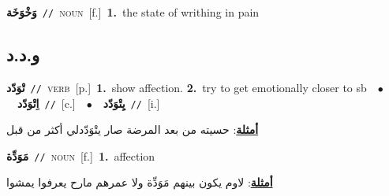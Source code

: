 \documentclass[10pt,a4paper,twoside]{article} %
\begin{document}
\begin{multicols}{2}
{\setlength\topsep{0pt}\textbf{\foreignlanguage{arabic}{وَخْوَخَة}}\ {\color{gray}\texttt{//}\color{black}}\ \textsc{noun}\ [f.]\ \textbf{1.}~the state of writhing in pain\ } \vspace{2mm}

\vspace{-3mm}
\subsection*{\color{blue}\foreignlanguage{arabic}{و.د.د}\color{blue}{}} 

{\setlength\topsep{0pt}\textbf{\foreignlanguage{arabic}{تْوَدّد}}\ {\color{gray}\texttt{//}\color{black}}\ \textsc{verb}\ [p.]\ \textbf{1.}~show affection.  \textbf{2.}~try to get emotionally closer to sb\ \ $\bullet$\ \ \setlength\topsep{0pt}\textbf{\foreignlanguage{arabic}{اِتْوَدّد}}\ {\color{gray}\texttt{//}\color{black}}\ [c.]\ \ $\bullet$\ \ \setlength\topsep{0pt}\textbf{\foreignlanguage{arabic}{يِتْوَدّد}}\ {\color{gray}\texttt{//}\color{black}}\ [i.]\  \begin{flushright}\color{gray}\foreignlanguage{arabic}{\textbf{\underline{\foreignlanguage{arabic}{أمثلة}}}: حسيته من بعد المرضة صار يتْوَدّدلي أكثر من قبل}\end{flushright}\color{black}} \vspace{2mm}

{\setlength\topsep{0pt}\textbf{\foreignlanguage{arabic}{مَوَدِّة}}\ {\color{gray}\texttt{//}\color{black}}\ \textsc{noun}\ [f.]\ \textbf{1.}~affection\  \begin{flushright}\color{gray}\foreignlanguage{arabic}{\textbf{\underline{\foreignlanguage{arabic}{أمثلة}}}: لاوم يكون بينهم مَوَدِّة ولا عمرهم مارح يعرفوا يمشوا}\end{flushright}\color{black}} \vspace{2mm}


\end{multicols}
\end{document}
